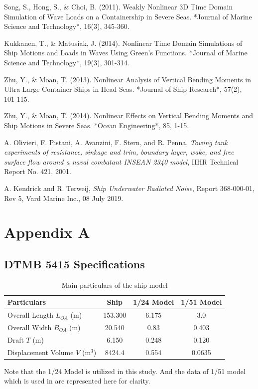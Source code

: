 \documentclass[12pt]{article} %
\begin{document}
\begin{thebibliography}{99}
     Song, S., Hong, S., \& Choi, B. (2011). Weakly Nonlinear 3D Time Domain Simulation of Wave Loads on a Containership in Severe Seas. *Journal of Marine Science and Technology*, 16(3), 345-360.

     Kukkanen, T., \& Matusiak, J. (2014). Nonlinear Time Domain Simulations of Ship Motions and Loads in Waves Using Green's Functions. *Journal of Marine Science and Technology*, 19(3), 301-314.

     Zhu, Y., \& Moan, T. (2013). Nonlinear Analysis of Vertical Bending Moments in Ultra-Large Container Ships in Head Seas. *Journal of Ship Research*, 57(2), 101-115.

     Zhu, Y., \& Moan, T. (2014). Nonlinear Effects on Vertical Bending Moments and Ship Motions in Severe Seas. *Ocean Engineering*, 85, 1-15.

    A. Olivieri, F. Pistani, A. Avanzini, F. Stern, and R. Penna, \emph{Towing tank experiments of resistance, sinkage and trim, boundary layer, wake, and free surface flow around a naval combatant INSEAN 2340 model}, IIHR Technical Report No. 421, 2001.
    
    A. Kendrick and R. Terweij, \emph{Ship Underwater Radiated Noise}, Report 368-000-01, Rev 5, Vard Marine Inc., 08 July 2019.   
    
    
\end{thebibliography}

\section{Appendix A}
\subsection{DTMB 5415 Specifications}
\begin{table}[h!]
    \centering
    \begin{tabular}{|l|c|c|c|}
        \hline
        \textbf{Particulars} & \textbf{Ship} & \textbf{1/24 Model} &\textbf{1/51 Model} \\ \hline
        Overall Length $L_{OA}$ (m) & 153.300 &6.175& 3.0 \\ \hline
        Overall Width $B_{OA}$ (m) & 20.540 &0.83& 0.403 \\ \hline
        Draft $T$ (m) & 6.150 &0.248& 0.120 \\ \hline
        Displacement Volume $V$ (m$^3$) & 8424.4 &0.554& 0.0635 \\ \hline
        \end{tabular}
    \caption{Main particulars of the ship model}
\end{table}
Note that the 1/24 Model is utilized in this study. And the data of 1/51 model which is used in 
\cite{Begovic2017} are represented here for clarity.
\end{document}
